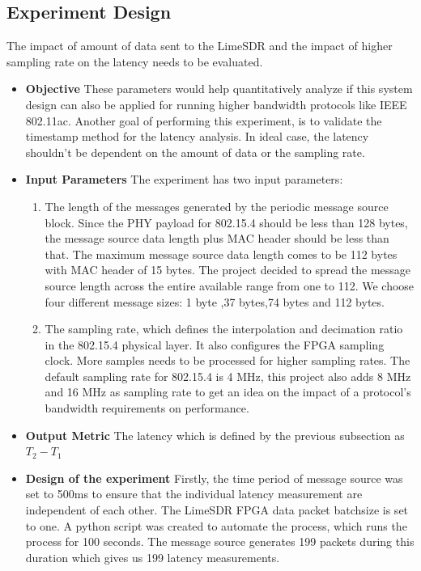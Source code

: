 \subsection{Experiment Design} \label{exp1}
The impact of amount of data sent to the LimeSDR and the impact of higher sampling rate on the latency needs to be evaluated.
\begin{itemize}
    \item {\textbf{Objective} These parameters would help quantitatively analyze if this system design can also be applied for running higher bandwidth protocols like IEEE 802.11ac.
Another goal of performing this experiment, is to validate the timestamp method for the latency analysis.
In ideal case, the latency shouldn't be dependent on the amount of data or the sampling rate.}
\item{\textbf{Input Parameters} The experiment has two input parameters:
\begin{enumerate}
    \item {The length of the messages generated by the periodic message source block.
    Since the PHY payload for 802.15.4 should be less than 128 bytes, the message source data length plus MAC header should be less than that.
    The maximum message source data length comes to be 112 bytes with MAC header of 15 bytes.
    The project decided to spread the message source length across the entire available range from one to 112.
    We choose four different message sizes: 1 byte ,37 bytes,74 bytes and 112 bytes.}
    \item {The sampling rate, which defines the interpolation and decimation ratio in the 802.15.4 physical layer.
    It also configures the FPGA sampling clock.
    More samples needs to be processed for higher sampling rates.
    The default sampling rate for 802.15.4 is 4 MHz, this project also adds 8 MHz and 16 MHz as sampling rate to get an idea on the impact of a protocol's bandwidth requirements on performance.
    }
\end{enumerate}
}
\item{\textbf{Output Metric} The latency which is defined by the previous subsection as $T_2 - T_1$}
\item{\textbf{Design of the experiment} Firstly, the time period of message source was set to 500ms to ensure that the individual latency measurement are independent of each other.
The LimeSDR FPGA data packet batchsize is set to one.
A python script was created to automate the process, which runs the process for 100 seconds.
The message source generates 199 packets during this duration which gives us 199 latency measurements.
}
\end{itemize}

